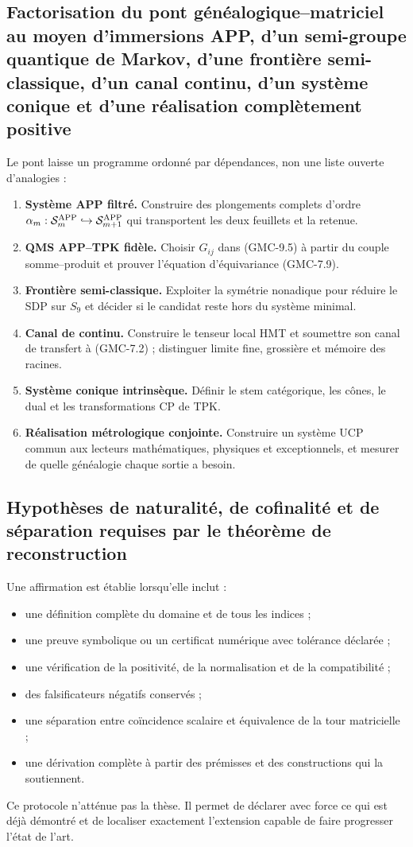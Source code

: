 \subsection{Factorisation du pont généalogique--matriciel au moyen d'immersions APP, d'un semi-groupe quantique de Markov, d'une frontière semi-classique, d'un canal continu, d'un système conique et d'une réalisation complètement positive}

Le pont laisse un programme ordonné par dépendances, non une liste ouverte
d'analogies :

\begin{enumerate}
 \item \textbf{Système APP filtré.} Construire des plongements complets
 d'ordre
 $\alpha_m:\mathcal S_m^{\rm APP}\hookrightarrow
 \mathcal S_{m+1}^{\rm APP}$ qui transportent les deux feuillets et la retenue.
 \item \textbf{QMS APP--TPK fidèle.} Choisir $G_{ij}$ dans
 \textup{(GMC-9.5)} à partir du couple somme--produit et prouver l'équation
 d'équivariance \textup{(GMC-7.9)}.
 \item \textbf{Frontière semi-classique.} Exploiter la symétrie nonadique pour
 réduire le SDP sur $S_9$ et décider si le candidat reste hors du système
 minimal.
 \item \textbf{Canal de continu.} Construire le tenseur local HMT et soumettre
 son canal de transfert à \textup{(GMC-7.2)} ; distinguer limite fine,
 grossière et mémoire des
 racines.
 \item \textbf{Système conique intrinsèque.} Définir le stem catégorique, les
 cônes, le dual et les transformations CP de TPK.
 \item \textbf{Réalisation métrologique conjointe.} Construire un système UCP
 commun aux lecteurs mathématiques, physiques et exceptionnels, et mesurer de quelle
 généalogie chaque sortie a besoin.
\end{enumerate}

\subsection{Hypothèses de naturalité, de cofinalité et de séparation requises par le théorème de reconstruction}

Une affirmation est établie lorsqu'elle inclut :

\begin{itemize}
 \item une définition complète du domaine et de tous les indices ;
 \item une preuve symbolique ou un certificat numérique avec tolérance déclarée ;
 \item une vérification de la positivité, de la normalisation et de la compatibilité ;
 \item des falsificateurs négatifs conservés ;
 \item une séparation entre coïncidence scalaire et équivalence de la tour
 matricielle ;
 \item une dérivation complète à partir des prémisses et des constructions qui la soutiennent.
\end{itemize}

Ce protocole n'atténue pas la thèse. Il permet de déclarer avec force ce qui
est déjà démontré et de localiser exactement l'extension capable de faire progresser
l'état de l'art.
